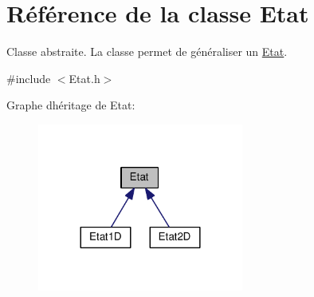 \hypertarget{class_etat}{}\section{Référence de la classe Etat}
\label{class_etat}


Classe abstraite. La classe permet de généraliser un \hyperlink{class_etat}{Etat}.  




{\ttfamily \#include $<$Etat.\+h$>$}



Graphe d\textquotesingle{}héritage de Etat\+:\nopagebreak
\begin{figure}[H]
\begin{center}
\leavevmode
\includegraphics[width=192pt]{class_etat__inherit__graph}
\end{center}
\end{figure}
